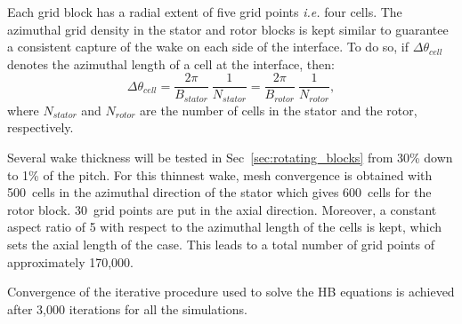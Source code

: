 Each grid block has a radial extent of five grid points \emph{i.e.} four cells. 
The azimuthal grid density in the stator and rotor blocks is kept similar
to guarantee a consistent capture of the wake on each side of the interface.
To do so, if $\Delta \theta_{cell}$ denotes the azimuthal length of a cell
at the interface, then:
\begin{equation}
   \Delta \theta_{cell} = \frac{2\pi}{B_{stator}}~\frac{1}{N_{stator}}
   = \frac{2\pi}{B_{rotor}}~\frac{1}{N_{rotor}},
   \label{eq:az_spatial_discretization_1}
\end{equation}
where $N_{stator}$ and $N_{rotor}$ are the number of cells
in the stator and the rotor, respectively. 

Several wake thickness will be tested in Sec~\ref{sec:rotating_blocks}
from 30\% down to 1\% of the pitch. For this thinnest wake, 
mesh convergence
is obtained with 500~cells in the azimuthal direction of
the stator which gives
600~cells for the rotor block.
30~grid points are put in the axial direction. Moreover, a constant
aspect ratio of 5 with respect to the azimuthal length of the cells is
kept, which sets the axial length of the case.
This leads to a total number of grid points of approximately 
170,000. 

Convergence of the iterative procedure used to solve the HB equations is achieved 
after 3,000 iterations for 
all the simulations. 